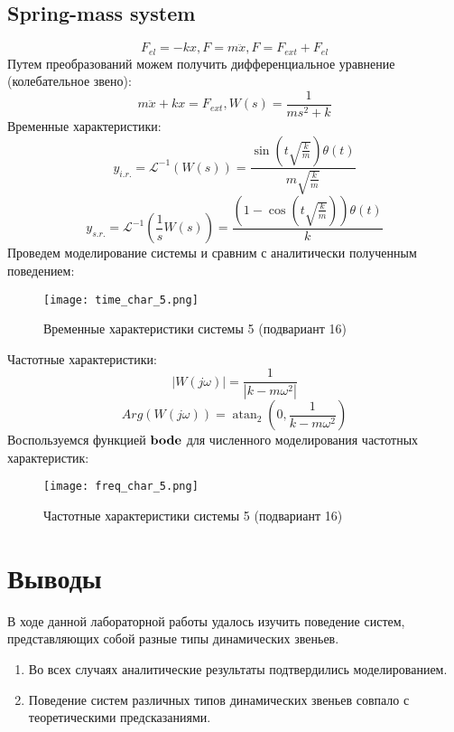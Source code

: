 \subsection*{Spring-mass system}
\begin{equation}
    F_{el} = -kx, F=m\ddot{x}, F=F_{ext} + F_{el}
\end{equation}
Путем преобразований можем получить дифференциальное уравнение (колебательное звено):
\begin{equation*}
    m\ddot{x}+kx=F_{ext}, W(s) = \frac{1}{ms^2 + k}
\end{equation*}
Временные характеристики:
\begin{equation*}
    y_{i.r.}=\mathcal{L}^{-1}(W(s)) = \frac{\sin{(t \sqrt{\frac{k}{m}} )} \theta(t)}{m \sqrt{\frac{k}{m}}}
\end{equation*}
\begin{equation*}
    y_{s.r.}=\mathcal{L}^{-1}(\frac{1}{s}W(s)) = \frac{(1 - \cos{(t \sqrt{\frac{k}{m}} )}) \theta(t)}{k}
\end{equation*}
Проведем моделирование системы и сравним с аналитически полученным поведением:
\begin{figure}[h]
    \centering
    \texttt{[image: time\_char\_5.png]}
    \caption{\label{fig:The-caption-1}Временные характеристики системы 5 (подвариант 16)}
\end{figure}

Частотные характеристики:
\begin{equation*}
    |W(j\omega)| = \frac{1}{|{k - m \omega^{2}}|}
\end{equation*}
\begin{equation*}
    Arg(W(j\omega)) = \operatorname{atan}_{2}{(0,\frac{1}{k - m \omega^{2}} )}
\end{equation*}
Воспользуемся функцией $\bold{bode}$ для численного моделирования частотных характеристик:
\begin{figure}[]
    \centering
    \texttt{[image: freq\_char\_5.png]}
    \caption{\label{fig:The-caption-1}Частотные характеристики системы 5 (подвариант 16)}
\end{figure}
\pagebreak

\section{Выводы}
В ходе данной лабораторной работы удалось изучить поведение систем, представляющих собой разные типы динамических звеньев.
\begin{enumerate}
    \item Во всех случаях аналитические результаты подтвердились моделированием.
    \item Поведение систем различных типов динамических звеньев совпало с теоретическими предсказаниями.
\end{enumerate}
\pagebreak